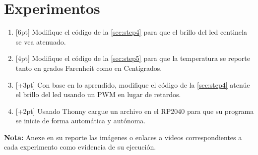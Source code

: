 %
%



\section{Experimentos}%
\label{sec:experiments}

\begin{enumerate}
	\item{} [6pt] Modifique el código de la \cref{sec:step4} para que el brillo del led centinela se vea atenuado.
	\item{} [4pt] Modifique el código de la \cref{sec:step5} para que la temperatura se reporte tanto en grados Farenheit como en Centígrados.
	\item{} [+3pt] Con base en lo aprendido, modifique el código de la \cref{sec:step4} atenúe el brillo del led usando un PWM en lugar de retardos.
	\item{} [+2pt] Usando Thonny cargue un archivo  en el RP2040 para que su programa se inicie de forma automática y autónoma.
\end{enumerate}

\noindent
\textbf{Nota:} Anexe en su reporte las imágenes o enlaces a videos correspondientes a cada experimento como evidencia de su ejecución.
